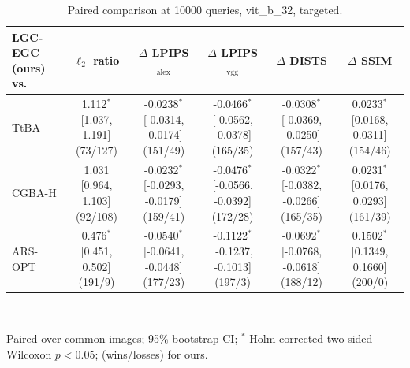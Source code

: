 \begin{table}[t]
\centering\footnotesize
\caption{Paired comparison at 10000 queries, vit\_b\_32, targeted.}
\begin{tabular}{lccccc}
\toprule
LGC-EGC (ours) vs. & $\ell_2$ ratio & $\Delta$ LPIPS$_{\mathrm{alex}}$ & $\Delta$ LPIPS$_{\mathrm{vgg}}$ & $\Delta$ DISTS & $\Delta$ SSIM \\
\midrule
TtBA & 1.112$^{*}$ [1.037, 1.191] (73/127) & -0.0238$^{*}$ [-0.0314, -0.0174] (151/49) & -0.0466$^{*}$ [-0.0562, -0.0378] (165/35) & -0.0308$^{*}$ [-0.0369, -0.0250] (157/43) & 0.0233$^{*}$ [0.0168, 0.0311] (154/46) \\
CGBA-H & 1.031 [0.964, 1.103] (92/108) & -0.0232$^{*}$ [-0.0293, -0.0179] (159/41) & -0.0476$^{*}$ [-0.0566, -0.0392] (172/28) & -0.0322$^{*}$ [-0.0382, -0.0266] (165/35) & 0.0231$^{*}$ [0.0176, 0.0293] (161/39) \\
ARS-OPT & 0.476$^{*}$ [0.451, 0.502] (191/9) & -0.0540$^{*}$ [-0.0641, -0.0448] (177/23) & -0.1122$^{*}$ [-0.1237, -0.1013] (197/3) & -0.0692$^{*}$ [-0.0768, -0.0618] (188/12) & 0.1502$^{*}$ [0.1349, 0.1660] (200/0) \\
\bottomrule
\end{tabular}
\\[2pt]\parbox{\linewidth}{\scriptsize Paired over common images; 95\% bootstrap CI; $^{*}$ Holm-corrected two-sided Wilcoxon $p<0.05$; (wins/losses) for ours.}
\end{table}
